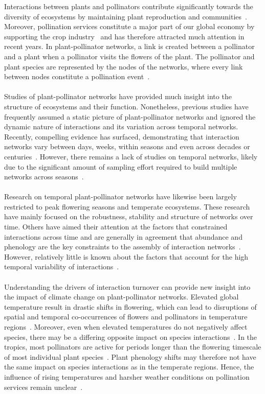 \documentclass[11pt]{article}
\begin{document}
Interactions between plants and pollinators contribute significantly towards the diversity of ecosystems by maintaining plant reproduction and communities~\citep{Olesen2008}. Moreover, pollination services constitute a major part of our global economy by supporting the crop industry~\citep{Allsopp2008} and has therefore attracted much attention in recent years. In plant-pollinator networks, a link is created between a pollinator and a plant when a pollinator visits the flowers of the plant. The pollinator and plant species are represented by the nodes of the networks, where every link between nodes constitute a pollination event~\citep{Olesen2008, Burkle2011, Poisot2012}.\\
\\
Studies of plant-pollinator networks have provided much insight into the structure of ecosystems and their function. Nonetheless, previous studies have frequently assumed a static picture of plant-pollinator networks and ignored the dynamic nature of interactions and its variation across temporal networks. Recently, compelling evidence has surfaced, demonstrating that interaction networks vary between days, weeks, within seasons and even across decades or centuries~\citep{Olesen2008, Burkle2013, Yeakel2014, CaraDonna2017}. However, there remains a lack of studies on temporal networks, likely due to the significant amount of sampling effort required to build multiple networks across seasons~\citep{Burkle2011}. \\
\\
Research on temporal plant-pollinator networks have likewise been largely restricted to peak flowering seasons and temperate ecosystems. These research have mainly focused on the robustness, stability and structure of networks over time. Others have aimed their attention at the factors that constrained interactions across time and are generally in agreement that abundance and phenology are the key constraints to the assembly of interaction networks~\citep{BASILIO2006, Olesen2008, CaraDonna2017}. However, relatively little is known about the factors that account for the high temporal variability of interactions~\citep{Burkle2011}.\\
\\
Understanding the drivers of interaction turnover can provide new insight into the impact of climate change on plant-pollinator networks. Elevated global temperature result in drastic shifts in flowering, which can lead to disruptions of spatial and temporal co-occurrences of flowers and pollinators in temperature regions~\citep{Schweiger2010}. Moreover, even when elevated temperatures do not negatively affect species, there may be a differing opposite impact on species interactions~\citep{Scaven2013}. In the tropics, most pollinators are active for periods longer than the flowering timescale of most individual plant species~\citep{Biesmeijer2006}. Plant phenology shifts may therefore not have the same impact on species interactions as in the temperate regions. Hence, the influence of rising temperatures and harsher weather conditions on pollination services remain unclear~\citep{Schweiger2010, Poisot2015}.  \\
\end{document}
